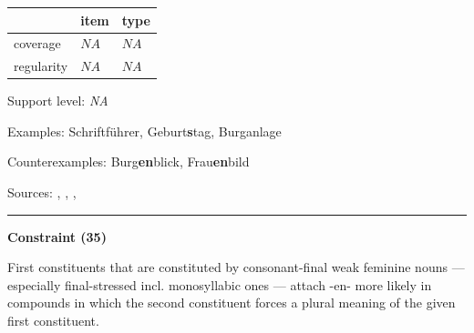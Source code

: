 \vspace{-0.25em}

\begin{table}[!ht]
\begin{center}
\setlength{\extrarowheight}{1pt}
\begin{tabularx}{\columnwidth}{|X|X|X|}
\hline
 & item & type \\
\hline
 coverage & $NA$ & $NA$ \\
\hline
 regularity & $NA$ & $NA$ \\
\hline
\end{tabularx}
\end{center}
\end{table}

\vspace{-1.35em}

\noindent
Support level: \textit{NA}

\vspace{0.3em}

\noindent
Examples: Schrift{\zeroLinker}führer, Geburt\textbf{s}tag, Burg{\zeroLinker}anlage

\noindent
Counterexamples: Burg\textbf{en}blick, Frau\textbf{en}bild

\vspace{0.3em}

\noindent
Sources: \citet[229]{eisenberg_2013}, \citet[3]{krott_etal_2007}, \citet[80]{nuebling_szczepaniak_2013}, \citet[94, 110]{ortner_mueller-bollhagen_1991}

\vspace{0.35em}
\hrule




\vspace{0.4em}

\begin{center}
\textbf{Constraint (35)}
\end{center}

\noindent
First constituents that are constituted by consonant-final weak feminine nouns --- especially final-stressed incl. monosyllabic ones --- attach -en- more likely in compounds in which the second constituent forces a plural meaning of the given first constituent.
\vspace{0.5em}


